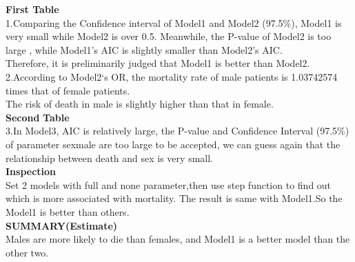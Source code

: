 \documentclass[landscape,final,a0paper]{baposter}
\begin{document}
\begin{poster}
{	{\bf First Table}
\\
1.Comparing the Confidence interval of Model1 and Model2 (97.5\%), Model1 is very small while Model2 is over 0.5. Meanwhile, the P-value of Model2 is too large , while Model1's AIC is slightly smaller than Model2's AIC. 
\\Therefore, it is preliminarily judged that Model1 is better than Model2.
\\2.According to Model2‘s OR, the mortality rate of male patients is 1.03742574 times that of female patients. 
\\The risk of death in male is slightly higher than that in female.
\\{\bf  Second }{\bf Table }
\\
3.In Model3, AIC is relatively large, the P-value and Confidence Interval (97.5\%) of parameter sexmale are too large to be accepted, we can guess again that the relationship between death and sex is very small.
\\{\bf Inspection }
\\Set 2 models with full and none parameter,then use step function to find out which is more associated with mortality.
The result is same with Model1.So the Model1 is better than others.
\\{\bf SUMMARY(Estimate)} \\ 
Males are more likely to die than females, and Model1 is a better model than the other two.
 }


\end{poster}
\end{document}
